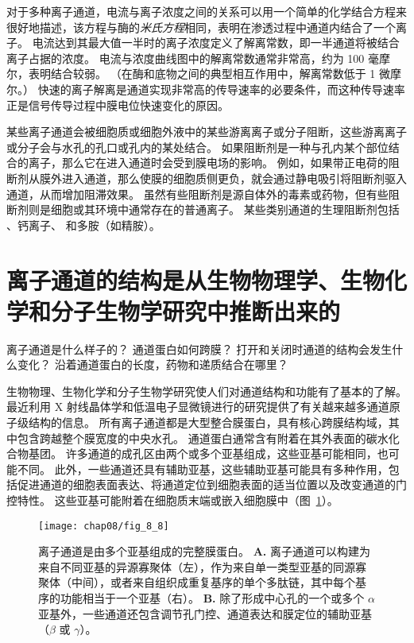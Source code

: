 对于多种离子通道，电流与离子浓度之间的关系可以用一个简单的化学结合方程来很好地描述，该方程与酶的\textit{米氏方程}相同，表明在渗透过程中通道内结合了一个离子。
电流达到其最大值一半时的离子浓度定义了解离常数，即一半通道将被结合离子占据的浓度。
电流与浓度曲线图中的解离常数通常非常高，约为 100 毫摩尔，表明结合较弱。
（在酶和底物之间的典型相互作用中，解离常数低于 1 微摩尔。）
快速的离子解离是通道实现非常高的传导速率的必要条件，而这种传导速率正是信号传导过程中膜电位快速变化的原因。


某些离子通道会被细胞质或细胞外液中的某些游离离子或分子阻断，这些游离离子或分子会与水孔的孔口或孔内的某处结合。
如果阻断剂是一种与孔内某个部位结合的离子，那么它在进入通道时会受到膜电场的影响。
例如，如果带正电荷的阻断剂从膜外进入通道，那么使膜的细胞质侧更负，就会通过静电吸引将阻断剂驱入通道，从而增加阻滞效果。
虽然有些阻断剂是源自体外的毒素或药物，但有些阻断剂则是细胞或其环境中通常存在的普通离子。
某些类别通道的生理阻断剂包括 、钙离子、 和多胺（如精胺）。



\section{离子通道的结构是从生物物理学、生物化学和分子生物学研究中推断出来的}

离子通道是什么样子的？
通道蛋白如何跨膜？
打开和关闭时通道的结构会发生什么变化？
沿着通道蛋白的长度，药物和递质结合在哪里？


生物物理、生物化学和分子生物学研究使人们对通道结构和功能有了基本的了解。
最近利用 X 射线晶体学和低温电子显微镜进行的研究提供了有关越来越多通道原子级结构的信息。
所有离子通道都是大型整合膜蛋白，具有核心跨膜结构域，其中包含跨越整个膜宽度的中央水孔。
通道蛋白通常含有附着在其外表面的碳水化合物基团。 许多通道的成孔区由两个或多个亚基组成，这些亚基可能相同，也可能不同。
此外，一些通道还具有辅助亚基，这些辅助亚基可能具有多种作用，包括促进通道的细胞表面表达、将通道定位到细胞表面的适当位置以及改变通道的门控特性。
这些亚基可能附着在细胞质末端或嵌入细胞膜中（图~\ref{fig:8_8}）。


\begin{figure}[htbp]
	\centering
	\texttt{[image: chap08/fig\_8\_8]}
	\caption{离子通道是由多个亚基组成的完整膜蛋白。
		\textbf{A.} 离子通道可以构建为来自不同亚基的异源寡聚体（左），作为来自单一类型亚基的同源寡聚体（中间），或者来自组织成重复基序的单个多肽链，其中每个基序的功能相当于一个亚基（右）。
		\textbf{B.} 除了形成中心孔的一个或多个 $\alpha$ 亚基外，一些通道还包含调节孔门控、通道表达和膜定位的辅助亚基（$\beta$ 或 $\gamma$）。}
	\label{fig:8_8}
\end{figure}


